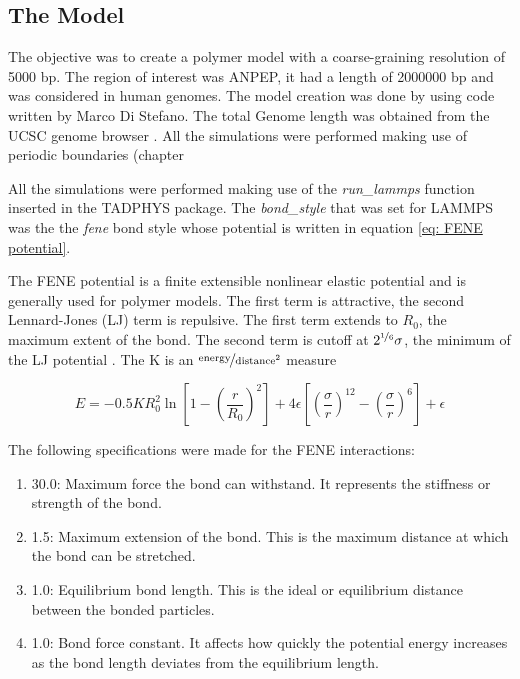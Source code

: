 
\subsection{The Model} \label{chap: the model description}
The objective was to create a polymer model with a coarse-graining resolution of 5000 bp. The region of interest was ANPEP, it had a length of 2000000 bp and was considered in human genomes. 
The model creation was done by using code written by Marco Di Stefano.
The total Genome length was obtained from the UCSC genome browser
\cite{UCSCGenomeBrowser}
. All the simulations were performed making use of periodic boundaries (chapter %

All the simulations were performed making use of the \textit{run\_lammps} function inserted in the TADPHYS package. The \textit{bond\_style} that was set for LAMMPS
\cite{thompsonLAMMPSFlexibleSimulation2022}
was the the \textit{fene} bond style whose potential is written in equation \ref{eq: FENE potential}. 

The FENE potential is a finite extensible nonlinear elastic potential and is generally used for polymer models. The first term is attractive, the second Lennard-Jones (LJ) term is repulsive. The first term extends to $R_0$, the maximum extent of the bond. The second term is cutoff at $2^{\nicefrac{1}{6}} \sigma$, the minimum of the LJ potential
\cite{thompsonLAMMPSFlexibleSimulation2022}
. The K is an $\nicefrac{\text{energy}}{\text{distance}^2}$ measure

\begin{equation} \label{eq: FENE potential}
    E = -0.5 K R_0^2 \ln{\left[1 - \left(\frac{r}{R_0}\right)^2\right]} + 4 \epsilon \left[\left(\frac{\sigma}{r}\right)^{12} - \left(\frac{\sigma}{r}\right)^6\right] + \epsilon
\end{equation}

The following specifications were made for the FENE interactions:

\begin{enumerate} %
    \item 30.0: Maximum force the bond can withstand. It represents the stiffness or strength of the bond.
    \item 1.5: Maximum extension of the bond. This is the maximum distance at which the bond can be stretched.
    \item 1.0: Equilibrium bond length. This is the ideal or equilibrium distance between the bonded particles.
    \item 1.0: Bond force constant. It affects how quickly the potential energy increases as the bond length deviates from the equilibrium length.
\end{enumerate}


